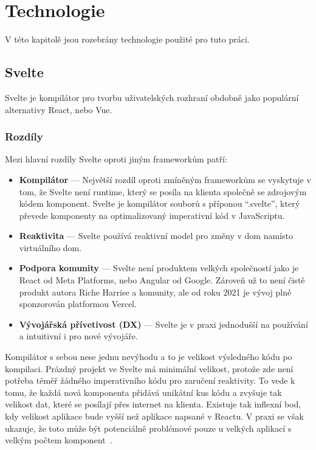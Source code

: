 \chapter{Technologie}

V této kapitolě jsou rozebrány technologie použité pro tuto práci.

\section{Svelte}\label{sec:Svelte}

Svelte je kompilátor pro tvorbu uživatelských rozhraní obdobně jako populární alternativy React, nebo Vue.


\subsection{Rozdíly}

Mezi hlavní rozdíly Svelte oproti jiným frameworkům patří:

\begin{itemize}
    \item \textbf{Kompilátor} --- Největší rozdíl oproti zmíněným frameworkům se vyskytuje v tom, že Svelte není runtime, který se posíla na klienta společně se zdrojovým kódem komponent.
          Svelte je kompilátor souborů s příponou ``.svelte'', který převede komponenty na optimalizovaný imperativní kód v JavaScriptu.
    \item \textbf{Reaktivita} --- Svelte používá reaktivní model pro změny v \gls{dom} namísto virtuálního \gls{dom}.
    \item \textbf{Podpora komunity} --- Svelte není produktem velkých společností jako je React od Meta Platforms, nebo Angular od Google.
          Zároveň už to není čistě produkt autora Riche Harrise a komunity, ale od roku 2021 je vývoj plně sponzorován platformou Vercel.
    \item \textbf{Vývojářská přívetivost (DX)} --- Svelte je v praxi jednodušší na používání a intuitivní i pro nové vývojáře.
\end{itemize}

Kompilátor s sebou nese jednu nevýhodu a to je velikost výsledného kódu po kompilaci.
Prázdný projekt ve Svelte má minimální velikost, protože zde není potřeba téměř žádného imperativního kódu pro zaručení reaktivity.
To vede k tomu, že každá nová komponenta přidává unikátní kus kódu a zvyšuje tak velikost dat, které se posílají přes internet na klienta.
Existuje tak inflexní bod, kdy velikost aplikace bude vyšší než aplikace napsané v Reactu.
V praxi se však ukazuje, že toto může být potenciálně problémové pouze u velkých aplikací s velkým počtem komponent~\cite{svelte-scaling}.

